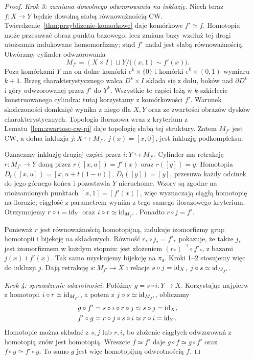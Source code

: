 \begin{proof}
\emph{Krok 3: zamiana dowolnego odwzorowania na inkluzję.}
Niech teraz $f:X\to Y$ będzie dowolną słabą równoważnością CW.
Twierdzenie~\ref{thm:przyblizenie-komorkowe} daje komórkowe
$f'\simeq f$. Homotopia może przesuwać obraz punktu bazowego,
lecz zmiana bazy wzdłuż tej drogi utożsamia indukowane
homomorfizmy; stąd $f'$ nadal jest słabą równoważnością.
Utwórzmy cylinder odwzorowania
\[
 M_{f'}=(X\times I)\sqcup Y/
       \bigl((x,1)\sim f'(x)\bigr).
\]
Poza komórkami $Y$ ma on dolne komórki $e^k\times\{0\}$
i komórki $e^k\times(0,1)$ wymiaru $k+1$.
Brzeg charakterystycznego walca $D^k\times I$ składa się
z dołu, boków nad $\partial D^k$ i góry odwzorowanej przez
$f'$ do $Y^k$. Wszystkie te części leżą w $k$-szkielecie
konstruowanego cylindra: tutaj korzystamy z komórkowości $f'$.
Warunek skończoności domknięć wynika z niego dla $X,Y$
oraz ze zwartości obrazów dysków charakterystycznych.
Topologia ilorazowa wraz z kryterium z
Lematu~\ref{lem:zwartosc-cw-pi} daje topologię słabą tej struktury.
Zatem $M_{f'}$ jest CW, a dolna inkluzja
$j:X\hookrightarrow M_{f'}$, $j(x)=[x,0]$, jest inkluzją podkompleksu.

Oznaczmy inkluzję drugiej części przez $i:Y\hookrightarrow M_{f'}$.
Cylinder ma retrakcję $r:M_{f'}\to Y$ daną przez
$r([x,u])=f'(x)$ oraz $r([y])=y$.
Homotopia $D_t([x,u])=[x,u+t(1-u)]$, $D_t([y])=[y]$,
przesuwa każdy odcinek do jego górnego końca i pozostawia $Y$
nieruchome. Wzory są zgodne na utożsamionych punktach
$[x,1]=[f'(x)]$, więc wyznaczają ciągłą homotopię na ilorazie;
ciągłość z parametrem wynika z tego samego ilorazowego kryterium.
Otrzymujemy $r\circ i=\mathrm{id}_Y$ oraz $i\circ r\simeq\mathrm{id}_{M_{f'}}$.
Ponadto $r\circ j=f'$.

Ponieważ $r$ jest równoważnością homotopijną, indukuje
izomorfizmy grup homotopii i bijekcję na składowych.
Równość $r_*\circ j_*=f'_*$ pokazuje, że także $j_*$
jest izomorfizmem w każdym stopniu: jest złożeniem
$(r_*)^{-1}\circ f'_*$, z bazami $j(x)$ i $f'(x)$.
Tak samo uzyskujemy bijekcję na $\pi_0$.
Kroki 1--2 stosujemy więc do inkluzji $j$.
Dają retrakcję $s:M_{f'}\to X$ i relacje
$s\circ j=\mathrm{id}_X$, $j\circ s\simeq\mathrm{id}_{M_{f'}}$.

\emph{Krok 4: sprawdzenie odwrotności.}
Połóżmy $g=s\circ i:Y\to X$.
Korzystając najpierw z homotopii $i\circ r\simeq\mathrm{id}_{M_{f'}}$,
a potem z $j\circ s\simeq\mathrm{id}_{M_{f'}}$, obliczamy
\[
 \begin{aligned}
 g\circ f'&=s\circ i\circ r\circ j
       \simeq s\circ j=\mathrm{id}_X,\\
 f'\circ g&=r\circ j\circ s\circ i
       \simeq r\circ i=\mathrm{id}_Y.
 \end{aligned}
\]
Homotopie można składać z $s,j$ lub $r,i$, bo złożenie
ciągłych odwzorowań z homotopią znów jest homotopią.
Wreszcie $f\simeq f'$ daje $g\circ f\simeq g\circ f'$
oraz $f\circ g\simeq f'\circ g$.
To samo $g$ jest więc homotopijną odwrotnością $f$.
\end{proof}

